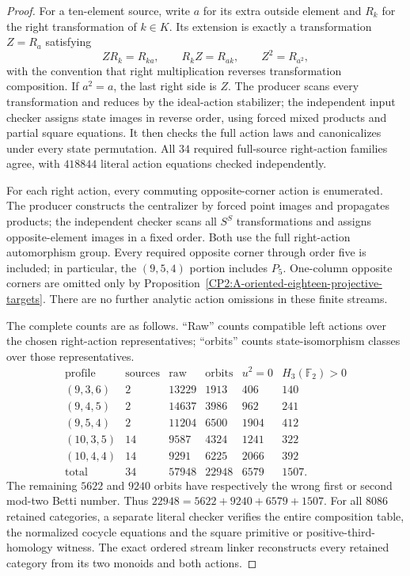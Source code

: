 \begin{proof}
For a ten-element source, write $a$ for its extra outside
element and $R_k$ for the right transformation of $k\in K$.
Its extension is exactly a transformation $Z=R_a$ satisfying
\[
 ZR_k=R_{ka},\qquad R_kZ=R_{ak},\qquad Z^2=R_{a^2},
\]
with the convention that right multiplication reverses
transformation composition.  If $a^2=a$, the last right
side is $Z$.  The producer scans every transformation and
reduces by the ideal-action stabilizer; the independent
input checker assigns state images in reverse order,
using forced mixed products and partial square equations.
It then checks the full action laws and canonicalizes
under every state permutation.  All $34$ required full-source
right-action families agree, with $418844$ literal action
equations checked independently.

For each right action, every commuting opposite-corner
action is enumerated.  The producer constructs the
centralizer by forced point images and propagates products;
the independent checker scans all $S^S$ transformations
and assigns opposite-element images in a fixed order.
Both use the full right-action automorphism group.
Every required opposite corner through order five is
included; in particular, the $(9,5,4)$ portion includes
$P_5$.  One-column opposite corners are omitted only by
Proposition~\ref{CP2:A-oriented-eighteen-projective-targets}.
There are no further analytic action omissions in these
finite streams.

The complete counts are as follows.  ``Raw'' counts
compatible left actions over the chosen right-action
representatives; ``orbits'' counts state-isomorphism
classes over those representatives.
\[
\begin{array}{c|r|r|r|r|r}
\text{profile}&\text{sources}&\text{raw}&\text{orbits}
 &u^2=0&H_3(\mathbb F_2)>0\\\hline
(9,3,6)&2&13229&1913&406&140\\
(9,4,5)&2&14637&3986&962&241\\
(9,5,4)&2&11204&6500&1904&412\\
(10,3,5)&14&9587&4324&1241&322\\
(10,4,4)&14&9291&6225&2066&392\\\hline
\text{total}&34&57948&22948&6579&1507.
\end{array}
\]
The remaining $5622$ and $9240$ orbits have respectively
the wrong first or second mod-two Betti number.  Thus
$22948=5622+9240+6579+1507$.  For all $8086$ retained
categories, a separate literal checker verifies the entire
composition table, the normalized cocycle equations and
the square primitive or positive-third-homology witness.
The exact ordered stream linker reconstructs every
retained category from its two monoids and both actions.


\end{proof}
